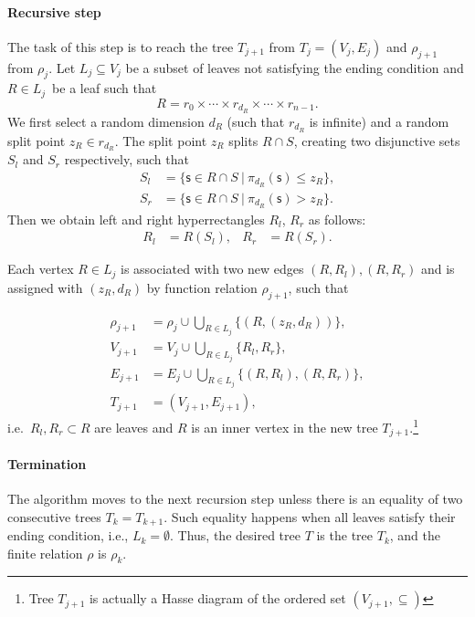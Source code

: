 \paragraph{Recursive step}
The task of this step is to reach the tree \(T_{j+1}\) from \(T_{j} = (V_j, E_j)\) and $\rho_{j+1}$ from $\rho_{j}.$
Let \(L_j \subseteq V_j\) be a subset of leaves not satisfying the
ending condition
and \(R \in L_j\)\ be a leaf such that
\[R =  r_0 \times \cdots \times r_{d_R} \times \cdots \times r_{n-1}. \]
We first select a random dimension $d_R$ (such that $r_{d_R}$ is infinite) and a random split point $z_R \in r_{d_R}$.
The split point $z_R$ splits $R \cap S$, creating two disjunctive sets $S_l$ and $S_r$ respectively, such that
\begin{align*}
S_l &= \{ \mathsf{s} \in{R \cap S}\ |\ \pi_{d_R}(\mathsf{s})\le z_R\},\\
S_r &= \{ \mathsf{s} \in{R \cap S}\ |\ \pi_{d_R}(\mathsf{s}) > z_R\}.
\end{align*}
Then we obtain left and right hyperrectangles \(R_l\), \(R_r\) as
follows:
\begin{align*}
R_l &= R(S_l),&
R_r &= R(S_r).
\end{align*}

Each vertex \(R \in L_j\) is associated with two new
edges \((R,R_l ), (R, R_r)\) and is assigned with $(z_R,d_R)$ by function relation $\rho_{j+1}$, such that


\begin{align*}
   \rho_{j+1} &= \rho_j \cup \bigcup_{R \in L_j} \{(R, (z_R, d_R))\}, \\
   V_{j+1} &= V_j \cup \bigcup_{R \in L_j} \{R_l, R_r\}, \\
   E_{j+1} &= E_j \cup \bigcup_{R \in L_j} \{(R, R_l), (R,R_r)\},\\
   T_{j+1} &= (V_{j+1}, E_{j+1}),
\end{align*}
i.e.~${R_l, R_r} \subset R$ are leaves and $R$ is an inner vertex in the new tree
\(T_{j+1}\).\footnote{Tree \(T_{j+1}\) is actually a Hasse diagram of the ordered set
\((V_{j+1},\subseteq)\)}


\paragraph{Termination} The algorithm moves to the next recursion step unless there is an equality of two consecutive trees \(T_k = T_{k+1}\). Such equality happens when all leaves satisfy their ending condition, i.e., \(L_k = \emptyset\).
Thus, the desired tree $T$ is the tree $T_k$, and the finite relation $\rho$ is $\rho_k$.


